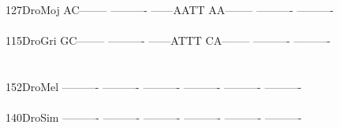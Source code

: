 \documentclass[11pt,twoside,reqno,a4paper]{article}
\begin{document}
{127\hspace*{2\charwidth}DroMoj	AC--------	----------	------AATT	AA--------	----------	----------	\\
\hspace*{5\charwidth}\hspace*{7\charwidth}\hspace*{1\charwidth}\hspace*{1\charwidth}\hspace*{1\charwidth}\hspace*{1\charwidth}\hspace*{1\charwidth}\hspace*{1\charwidth}\\
115\hspace*{2\charwidth}DroGri	GC--------	----------	------ATTT	CA--------	----------	----------	\\
\hspace*{5\charwidth}\hspace*{7\charwidth}\hspace*{1\charwidth}\hspace*{1\charwidth}\hspace*{1\charwidth}\hspace*{1\charwidth}\hspace*{1\charwidth}\hspace*{1\charwidth}\\
\\
152\hspace*{2\charwidth}DroMel	----------	----------	----------	----------	----------	----------	\\
\hspace*{5\charwidth}\hspace*{7\charwidth}\hspace*{1\charwidth}\hspace*{1\charwidth}\hspace*{1\charwidth}\hspace*{1\charwidth}\hspace*{1\charwidth}\hspace*{1\charwidth}\\
140\hspace*{2\charwidth}DroSim	----------	----------	----------	----------	----------	----------	\\
\hspace*{5\charwidth}\hspace*{7\charwidth}\hspace*{1\charwidth}\hspace*{1\charwidth}\hspace*{1\charwidth}\hspace*{1\charwidth}\hspace*{1\charwidth}\hspace*{1\charwidth}\\
}
\end{document}
